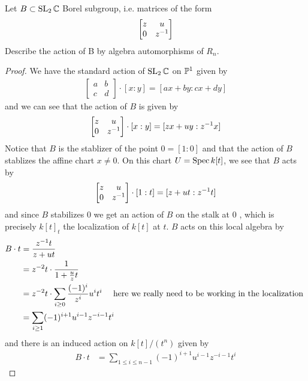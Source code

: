 \documentclass[12pt]{article}
\begin{document}
\begin{exercise}
    Let $B \subset \SL_2\C$ Borel subgroup, i.e. matrices of the form \[\begin{bmatrix}
        z & u \\
        0 & \inv{z}
    \end{bmatrix}\] 
    Describe the action of B by algebra automorphisms of $R_n$.
\end{exercise}

\begin{proof}
We have the standard action of $\SL_2\C$ on $\P^1$ given by \begin{align*}
    \begin{bmatrix}
        a & b \\
        c & d
    \end{bmatrix}\cdot [x:y] = [ax + by: cx + dy]
\end{align*} and we can see that the action of $B$ is given by \begin{align*}
    \begin{bmatrix}
        z & u \\
        0 & \inv{z}
    \end{bmatrix}\cdot [x:y] = [zx + uy: \inv{z}x]
\end{align*} Notice that $B$ is the stablizer of the point $0 = [1:0]$ and that the action of $B$ stablizes
the affine chart $x\neq 0$. On this chart $U = \Spec k[t]$, we see that $B$ acts by \begin{align*}
    \begin{bmatrix}
        z & u \\
        0 & \inv{z}
    \end{bmatrix}\cdot [1:t] = [z + ut: \inv{z}t]
\end{align*} and since $B$ stabilizes $0$ we get an action of $B$ on the stalk at $0$ 
, which is
precisely $k[t]_{t}$ the localization of $k[t]$ at $t$. $B$ acts on this local algebra by 
\begin{align*}
    B\cdot t &= \frac{\inv{z}t}{z + ut} \\
    &= z^{-2}t\cdot \frac{1}{1 + \frac{u}{z}t} \\
    &= z^{-2}t\cdot \sum_{i\geq 0} \frac{(-1)^i}{z^i}u^it^i \text{ \quad here we really need to be working
    in the localization }\\
    &= \sum_{i\geq 1} (-1)^{i+1}u^{i-1}z^{-i-1}t^i
\end{align*} and there is an induced action on $k[t]/(t^n)$ given by \begin{align*}
    B\cdot t &= \sum_{1\leq i\leq n-1} (-1)^{i+1}u^{i-1}z^{-i-1}t^i
\end{align*}\end{proof}
\end{document}

